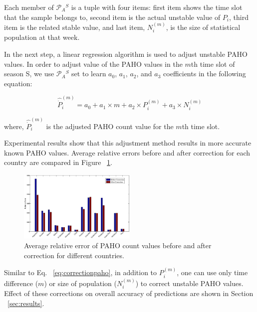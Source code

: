 Each member of $\mathcal{P}_A{^S}$ is a tuple with four items: first item shows the time slot that the sample belongs to, second item is the actual unstable value of $P_i$, third item is the related stable value, and last item, $N_i^{(m)}$, is the size of statistical population at that week.

In the next step, a linear regression algorithm is used to adjust unstable PAHO values. In order to adjust value of the PAHO values in the $m$th time slot of season S, we use $\mathcal{P}_A{^S}$ set to learn $a_0$, $a_1$, $a_2$, and $a_3$ coefficients in the following equation:

\begin{equation}
\hat{\dot{P}}_i^{(m)} = a_0 + a_1 \times m + a_2 \times P_i^{(m)} + a_3 \times N_i^{(m)}
\end{equation}

where, $\hat{\dot{P}}_i^{(m)}$ is the adjusted PAHO count value for the $m$th time slot.

Experimental results show that this adjustment method results in more accurate known PAHO values. Average relative errors before and after correction for each country are compared in Figure ~\ref{fig:avgrelerrors}.


\begin{figure}[h]
  \centering
    \includegraphics[width=0.5\textwidth]{fig/errs.eps}
  \caption{Average relative error of PAHO count values before and after correction for different countries.}
  \label{fig:avgrelerrors}
\end{figure}

Similar to Eq. ~\ref{eq:correctionpaho}, in addition to $P_i^{(m)}$, one can use only time difference ($m$) or size of population ($N_i^{(m)}$) to correct unstable PAHO values. Effect of these corrections on overall accuracy of predictions are shown in Section ~\ref{sec:results}.
